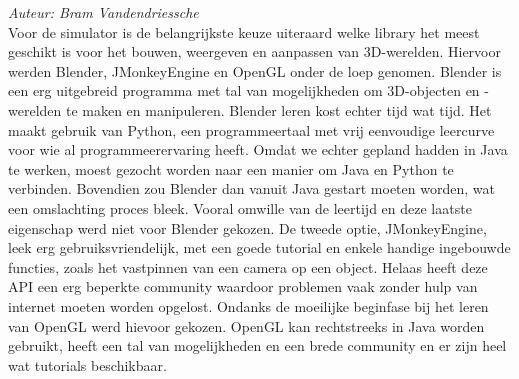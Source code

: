 {\em Auteur: Bram Vandendriessche}\\


Voor de simulator is de belangrijkste keuze uiteraard welke library het meest geschikt is voor het bouwen, weergeven en aanpassen van 3D-werelden. Hiervoor werden Blender, JMonkeyEngine en OpenGL onder de loep genomen. Blender is een erg uitgebreid programma met tal van mogelijkheden om 3D-objecten en -werelden te maken en manipuleren. Blender leren kost echter tijd wat tijd. Het maakt gebruik van Python, een programmeertaal met vrij eenvoudige leercurve voor wie al programmeerervaring heeft. Omdat we echter gepland hadden in Java te werken, moest gezocht worden naar een manier om Java en Python te verbinden. Bovendien zou Blender dan vanuit Java gestart moeten worden, wat een omslachting proces bleek. Vooral omwille van de leertijd en deze laatste eigenschap werd niet voor Blender gekozen. De tweede optie, JMonkeyEngine, leek erg gebruiksvriendelijk, met een goede tutorial en enkele handige ingebouwde functies, zoals het vastpinnen van een camera op een object. Helaas heeft deze API een erg beperkte community waardoor problemen vaak zonder hulp van internet moeten worden opgelost. Ondanks de moeilijke beginfase bij het leren van OpenGL werd hievoor gekozen. OpenGL kan rechtstreeks in Java worden gebruikt, heeft een tal van mogelijkheden en een brede community en er zijn heel wat tutorials beschikbaar. 


